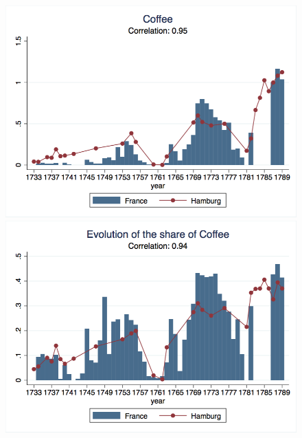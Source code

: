 \documentclass[12pt,a4paper,titlepage,english]{article}
\begin{document}
\begin{figure}
\includegraphics[scale=.28]{coffee_long.png}
\includegraphics[scale=.28]{coffee_share_long.png}\\

\end{figure}
\end{document}
